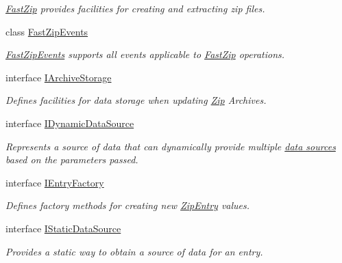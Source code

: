 \begin{DoxyCompactItemize}
\begin{DoxyCompactList}\small\item\em \hyperlink{class_i_c_sharp_code_1_1_sharp_zip_lib_1_1_zip_1_1_fast_zip}{Fast\+Zip} provides facilities for creating and extracting zip files. \end{DoxyCompactList}\item 
class \hyperlink{class_i_c_sharp_code_1_1_sharp_zip_lib_1_1_zip_1_1_fast_zip_events}{Fast\+Zip\+Events}
\begin{DoxyCompactList}\small\item\em \hyperlink{class_i_c_sharp_code_1_1_sharp_zip_lib_1_1_zip_1_1_fast_zip_events}{Fast\+Zip\+Events} supports all events applicable to \hyperlink{class_i_c_sharp_code_1_1_sharp_zip_lib_1_1_zip_1_1_fast_zip}{Fast\+Zip} operations. \end{DoxyCompactList}\item 
interface \hyperlink{interface_i_c_sharp_code_1_1_sharp_zip_lib_1_1_zip_1_1_i_archive_storage}{I\+Archive\+Storage}
\begin{DoxyCompactList}\small\item\em Defines facilities for data storage when updating \hyperlink{namespace_i_c_sharp_code_1_1_sharp_zip_lib_1_1_zip}{Zip} Archives. \end{DoxyCompactList}\item 
interface \hyperlink{interface_i_c_sharp_code_1_1_sharp_zip_lib_1_1_zip_1_1_i_dynamic_data_source}{I\+Dynamic\+Data\+Source}
\begin{DoxyCompactList}\small\item\em Represents a source of data that can dynamically provide multiple \hyperlink{}{data sources} based on the parameters passed. \end{DoxyCompactList}\item 
interface \hyperlink{interface_i_c_sharp_code_1_1_sharp_zip_lib_1_1_zip_1_1_i_entry_factory}{I\+Entry\+Factory}
\begin{DoxyCompactList}\small\item\em Defines factory methods for creating new \hyperlink{class_i_c_sharp_code_1_1_sharp_zip_lib_1_1_zip_1_1_zip_entry}{Zip\+Entry} values. \end{DoxyCompactList}\item 
interface \hyperlink{interface_i_c_sharp_code_1_1_sharp_zip_lib_1_1_zip_1_1_i_static_data_source}{I\+Static\+Data\+Source}
\begin{DoxyCompactList}\small\item\em Provides a static way to obtain a source of data for an entry. \end{DoxyCompactList}\item 

\end{DoxyCompactItemize}
